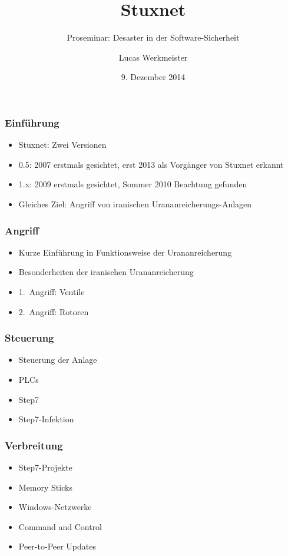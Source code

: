 \documentclass{beamer}
\title{Stuxnet}
\subtitle{Proseminar: Desaster in der Software-Sicherheit}
\author{Lucas Werkmeister}
\date{9. Dezember 2014}
\begin{document}
\newcommand{\ufsechs}[0]{$\mathrm{UF_6}$\xspace}

\begin{frame}
  \titlepage
\end{frame}

\begin{frame}
  \frametitle{Einführung}
  \begin{itemize}
    \item Stuxnet: Zwei Versionen
    \item 0.5: 2007 erstmals gesichtet, erst 2013 als Vorgänger von Stuxnet erkannt
    \item 1.x: 2009 erstmals gesichtet, Sommer 2010 Beachtung gefunden
    \item Gleiches Ziel: Angriff von iranischen Urananreicherungs-Anlagen
  \end{itemize}
\end{frame}

\begin{frame}
  \frametitle{Angriff}
  \begin{itemize}
    \item Kurze Einführung in Funktionsweise der Urananreicherung
    \item Besonderheiten der iranischen Urananreicherung
    \item 1.~Angriff: Ventile
    \item 2.~Angriff: Rotoren
  \end{itemize}
\end{frame}

\begin{frame}
  \frametitle{Steuerung}
  \begin{itemize}
    \item Steuerung der Anlage
    \item PLCs
    \item Step7
    \item Step7-Infektion
  \end{itemize}
\end{frame}

\begin{frame}
  \frametitle{Verbreitung}
  \begin{itemize}
    \item Step7-Projekte
    \item Memory Sticks
    \item Windows-Netzwerke
    \item Command and Control
    \item Peer-to-Peer Updates
  \end{itemize}
\end{frame}
\end{document}
